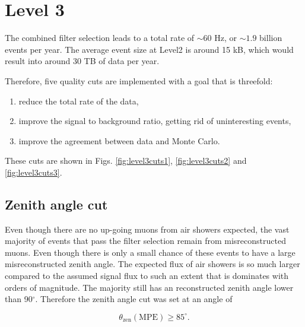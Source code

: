 \section{Level 3}
The combined filter selection leads to a total rate of $\sim60$ Hz, or $\sim1.9$ billion events per year. The average event size at Level2 is around 15 kB, which would result into around 30 TB of data per year.

Therefore, five quality cuts are implemented with a goal that is threefold:
\vspace{2mm}
\begin{enumerate}
\item reduce the total rate of the data,
\item improve the signal to background ratio, getting rid of uninteresting events,
\item improve the agreement between data and Monte Carlo.
\end{enumerate}
\vspace{2mm}
\noindent These cuts are shown in Figs. \ref{fig:level3cuts1}, \ref{fig:level3cuts2} and \ref{fig:level3cuts3}.

\subsection{Zenith angle cut}
Even though there are no up-going muons from air showers expected, the vast majority of events that pass the filter selection remain from misreconstructed muons. Even though there is only a small chance of these events to have a large misreconstructed zenith angle. The expected flux of air showers is so much larger compared to the assumed signal flux to such an extent that is dominates with orders of magnitude. The majority still has an reconstructed zenith angle lower than 90$^\circ$. Therefore the zenith angle cut was set at an angle of 

\begin{equation}
\theta_\textrm{zen} (\textrm{MPE}) \geq 85^\circ.
\end{equation}

